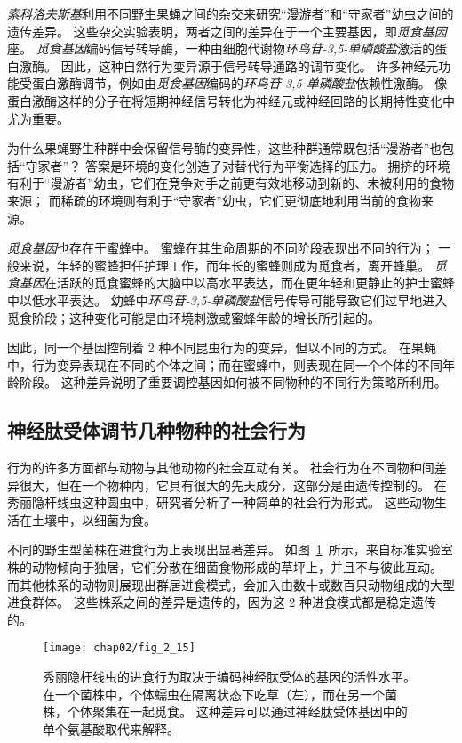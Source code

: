 \textit{索科洛夫斯基}利用不同野生果蝇之间的杂交来研究“漫游者”和“守家者”幼虫之间的遗传差异。
这些杂交实验表明，两者之间的差异在于一个主要基因，即\textit{觅食基因}座。
\textit{觅食基因}编码信号转导酶，一种由细胞代谢物\textit{环鸟苷-3,5-单磷酸盐}激活的蛋白激酶。
因此，这种自然行为变异源于信号转导通路的调节变化。
许多神经元功能受蛋白激酶调节，例如由\textit{觅食基因}编码的\textit{环鸟苷-3,5-单磷酸盐}依赖性激酶。
像蛋白激酶这样的分子在将短期神经信号转化为神经元或神经回路的长期特性变化中尤为重要。


为什么果蝇野生种群中会保留信号酶的变异性，这些种群通常既包括“漫游者”也包括“守家者”？
答案是环境的变化创造了对替代行为平衡选择的压力。 
拥挤的环境有利于“漫游者”幼虫，它们在竞争对手之前更有效地移动到新的、未被利用的食物来源；
而稀疏的环境则有利于“守家者”幼虫，它们更彻底地利用当前的食物来源。


\textit{觅食基因}也存在于蜜蜂中。
蜜蜂在其生命周期的不同阶段表现出不同的行为；
一般来说，年轻的蜜蜂担任护理工作，而年长的蜜蜂则成为觅食者，离开蜂巢。
\textit{觅食基因}在活跃的觅食蜜蜂的大脑中以高水平表达，而在更年轻和更静止的护士蜜蜂中以低水平表达。
幼蜂中\textit{环鸟苷-3,5-单磷酸盐}信号传导可能导致它们过早地进入觅食阶段；这种变化可能是由环境刺激或蜜蜂年龄的增长所引起的。


因此，同一个基因控制着 2 种不同昆虫行为的变异，但以不同的方式。
在果蝇中，行为变异表现在不同的个体之间；而在蜜蜂中，则表现在同一个个体的不同年龄阶段。
这种差异说明了重要调控基因如何被不同物种的不同行为策略所利用。



\subsection{神经肽受体调节几种物种的社会行为}

行为的许多方面都与动物与其他动物的社会互动有关。
社会行为在不同物种间差异很大，但在一个物种内，它具有很大的先天成分，这部分是由遗传控制的。
在秀丽隐杆线虫这种圆虫中，研究者分析了一种简单的社会行为形式。
这些动物生活在土壤中，以细菌为食。



不同的野生型菌株在进食行为上表现出显著差异。
如图~\ref{fig:2_15}~所示，来自标准实验室株的动物倾向于独居，它们分散在细菌食物形成的草坪上，并且不与彼此互动。
而其他株系的动物则展现出群居进食模式，会加入由数十或数百只动物组成的大型进食群体。
这些株系之间的差异是遗传的，因为这 2 种进食模式都是稳定遗传的。






\begin{figure}[htbp]
	\centering
	\texttt{[image: chap02/fig\_2\_15]}
	\caption{秀丽隐杆线虫的进食行为取决于编码神经肽受体的基因的活性水平。
		在一个菌株中，个体蠕虫在隔离状态下吃草（左），而在另一个菌株，个体聚集在一起觅食。
		这种差异可以通过神经肽受体基因中的单个氨基酸取代来解释\cite{de1998natural}。}
	\label{fig:2_15}
\end{figure}


